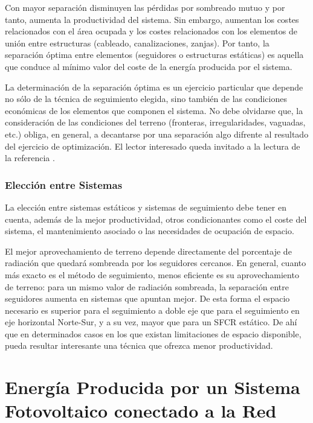 Con mayor separación disminuyen las pérdidas por sombreado
mutuo y por tanto, aumenta la productividad del sistema. Sin embargo, aumentan los costes relacionados con
el área ocupada y los costes relacionados con los elementos de unión
entre estructuras (cableado, canalizaciones, zanjas). 
Por tanto, la separación óptima entre elementos (seguidores o estructuras
estáticas) es aquella que conduce al mínimo valor del coste
de la energía producida por el sistema. 

La determinación de la separación óptima es un ejercicio
particular que depende no sólo de la técnica de
seguimiento elegida, sino también de las condiciones económicas de los
elementos que componen el sistema. No debe olvidarse que, la
consideración de las condiciones del terreno (fronteras, irregularidades, vaguadas,
etc.) obliga, en general, a decantarse por una separación algo difrente al
resultado del ejercicio de optimización.  El lector interesado queda
invitado a la lectura de la referencia \cite{Perpinan2012}.


\subsubsection{Elección entre Sistemas}
\label{sec:eleccion-sistemas}

La elección entre sistemas estáticos y sistemas de seguimiento debe
tener en cuenta, además de la mejor productividad, otros
condicionantes como el coste del sistema, el mantenimiento asociado o
las necesidades de ocupación de espacio. 

El mejor aprovechamiento de terreno depende directamente del
porcentaje de radiación que quedará sombreada por los seguidores
cercanos. En general, cuanto más exacto es el método de seguimiento,
menos eficiente es su aprovechamiento de terreno: para un mismo valor
de radiación sombreada, la separación entre seguidores aumenta en
sistemas que apuntan mejor. De esta forma el espacio necesario es
superior para el seguimiento a doble eje que para el seguimiento en eje
horizontal Norte-Sur, y a su vez, mayor que para un SFCR estático. De
ahí que en determinados casos en los que existan limitaciones de
espacio disponible, pueda resultar interesante una técnica que ofrezca
menor productividad.


\section{Energía Producida por un Sistema Fotovoltaico conectado a
  la Red}

